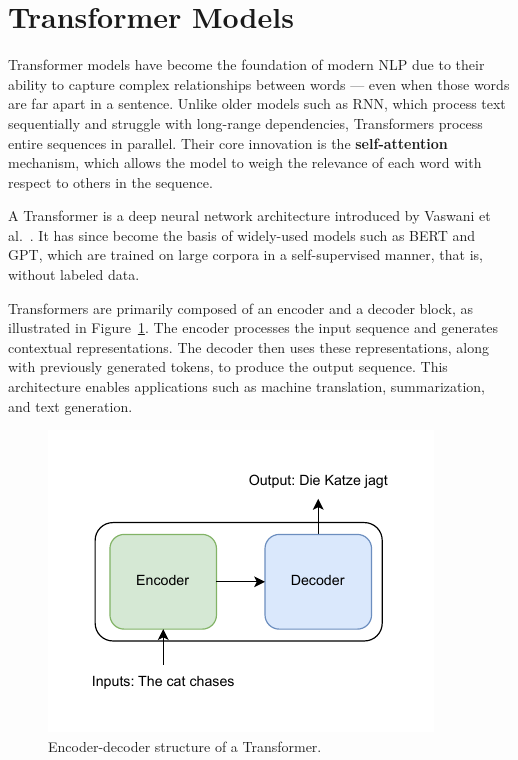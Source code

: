 \section{Transformer Models}\label{TM}
Transformer models have become the foundation of modern \ac{NLP} due to their ability to capture complex relationships between words — even when those words are far apart in a sentence.
Unlike older models such as \ac{RNN}, which process text sequentially and struggle with long-range dependencies, Transformers process entire sequences in parallel.
Their core innovation is the \textbf{self-attention} mechanism, which allows the model to weigh the relevance of each word with respect to others in the sequence.

A Transformer is a deep neural network architecture introduced by Vaswani et al.~\cite{vaswani_attention_2023}.
It has since become the basis of widely-used models such as BERT and GPT, which are trained on large corpora in a self-supervised manner, that is, without labeled data.

Transformers are primarily composed of an encoder and a decoder block, as illustrated in Figure~\ref{fig:encoderDecoder}.
The encoder processes the input sequence and generates contextual representations.
The decoder then uses these representations, along with previously generated tokens, to produce the output sequence.
This architecture enables applications such as machine translation, summarization, and text generation.



\begin{figure}[htb]
    \centering
    \includegraphics[width=0.45\linewidth]{Abschlussarbeit/Pictures/encoder_decoder_simple (1).pdf}
    \caption{Encoder-decoder structure of a Transformer.}
    \label{fig:encoderDecoder}
\end{figure}

